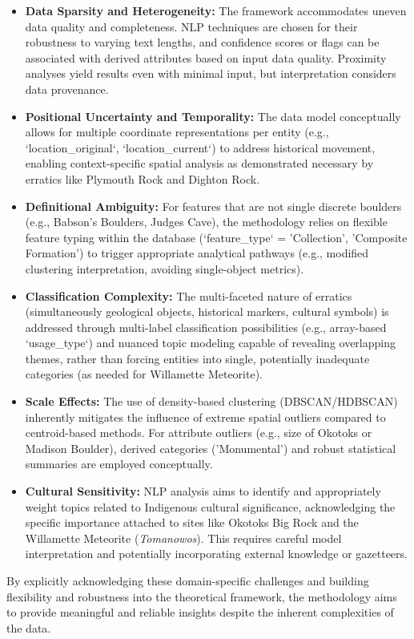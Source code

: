 \begin{itemize}
    \item \textbf{Data Sparsity and Heterogeneity:} The framework accommodates uneven data quality and completeness. NLP techniques are chosen for their robustness to varying text lengths, and confidence scores or flags can be associated with derived attributes based on input data quality. Proximity analyses yield results even with minimal input, but interpretation considers data provenance.
    \item \textbf{Positional Uncertainty and Temporality:} The data model conceptually allows for multiple coordinate representations per entity (e.g., `location\_original`, `location\_current`) to address historical movement, enabling context-specific spatial analysis as demonstrated necessary by erratics like Plymouth Rock and Dighton Rock.
    \item \textbf{Definitional Ambiguity:} For features that are not single discrete boulders (e.g., Babson's Boulders, Judges Cave), the methodology relies on flexible feature typing within the database (`feature\_type` = 'Collection', 'Composite Formation') to trigger appropriate analytical pathways (e.g., modified clustering interpretation, avoiding single-object metrics).
    \item \textbf{Classification Complexity:} The multi-faceted nature of erratics (simultaneously geological objects, historical markers, cultural symbols) is addressed through multi-label classification possibilities (e.g., array-based `usage\_type`) and nuanced topic modeling capable of revealing overlapping themes, rather than forcing entities into single, potentially inadequate categories (as needed for Willamette Meteorite).
    \item \textbf{Scale Effects:} The use of density-based clustering (DBSCAN/HDBSCAN) inherently mitigates the influence of extreme spatial outliers compared to centroid-based methods. For attribute outliers (e.g., size of Okotoks or Madison Boulder), derived categories ('Monumental') and robust statistical summaries are employed conceptually.
    \item \textbf{Cultural Sensitivity:} NLP analysis aims to identify and appropriately weight topics related to Indigenous cultural significance, acknowledging the specific importance attached to sites like Okotoks Big Rock and the Willamette Meteorite (\emph{Tomanowos}). This requires careful model interpretation and potentially incorporating external knowledge or gazetteers.
\end{itemize}
By explicitly acknowledging these domain-specific challenges and building flexibility and robustness into the theoretical framework, the methodology aims to provide meaningful and reliable insights despite the inherent complexities of the data.

